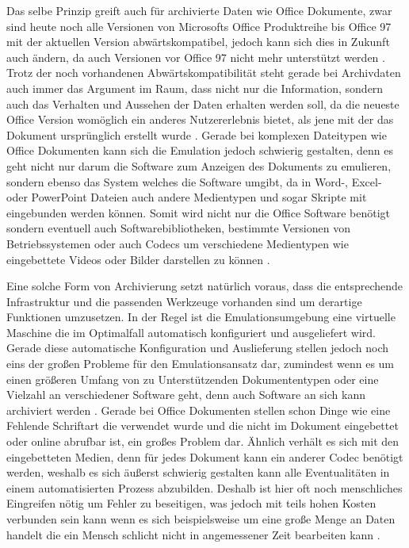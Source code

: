 \documentclass[conference,compsoc,final,a4paper]{IEEEtran}
\begin{document}
Das selbe Prinzip greift auch für archivierte Daten wie Office Dokumente, zwar sind heute noch alle Versionen von Microsofts Office Produktreihe bis Office 97 mit der aktuellen Version abwärtskompatibel, jedoch kann sich dies in Zukunft auch ändern, da auch Versionen vor Office 97 nicht mehr unterstützt werden \autocite{MSOfficeFileFormats}. Trotz der noch vorhandenen Abwärtskompatibilität steht gerade bei Archivdaten auch immer das Argument im Raum, dass nicht nur die Information, sondern auch das Verhalten und Aussehen der Daten erhalten werden soll, da die neueste Office Version womöglich ein anderes Nutzererlebnis bietet, als jene mit der das Dokument ursprünglich erstellt wurde \autocite{Lee2002}. Gerade bei komplexen Dateitypen wie Office Dokumenten kann sich die Emulation jedoch schwierig gestalten, denn es geht nicht nur darum die Software zum Anzeigen des Dokuments zu emulieren, sondern ebenso das System welches die Software umgibt, da in Word-, Excel- oder PowerPoint Dateien auch andere Medientypen und sogar Skripte mit eingebunden werden können. Somit wird nicht nur die Office Software benötigt sondern eventuell auch Softwarebibliotheken, bestimmte Versionen von Betriebssystemen oder auch Codecs um verschiedene Medientypen wie eingebettete Videos oder Bilder darstellen zu können \autocite{Reichherzer2006}.

Eine solche Form von Archivierung setzt natürlich voraus, dass die entsprechende Infrastruktur und die passenden Werkzeuge vorhanden sind um derartige Funktionen umzusetzen. In der Regel ist die Emulationsumgebung eine virtuelle Maschine die im Optimalfall automatisch konfiguriert und ausgeliefert wird. Gerade diese automatische Konfiguration und Auslieferung stellen jedoch noch eins der großen Probleme für den Emulationsansatz dar, zumindest wenn es um einen größeren Umfang von zu Unterstützenden Dokumententypen oder eine Vielzahl an verschiedener Software geht, denn auch Software an sich kann archiviert werden \autocite{Reichherzer2006}. Gerade bei Office Dokumenten stellen schon Dinge wie eine Fehlende Schriftart die verwendet wurde und die nicht im Dokument eingebettet oder online abrufbar ist, ein großes Problem dar. Ähnlich verhält es sich mit den eingebetteten Medien, denn für jedes Dokument kann ein anderer Codec benötigt werden, weshalb es sich äußerst schwierig gestalten kann alle Eventualitäten in einem automatisierten Prozess abzubilden. Deshalb ist hier oft noch menschliches Eingreifen nötig um Fehler zu beseitigen, was jedoch mit teils hohen Kosten verbunden sein kann wenn es sich beispielsweise um eine große Menge an Daten handelt die ein Mensch schlicht nicht in angemessener Zeit bearbeiten kann \autocite{Reichherzer2006}.
\end{document}

